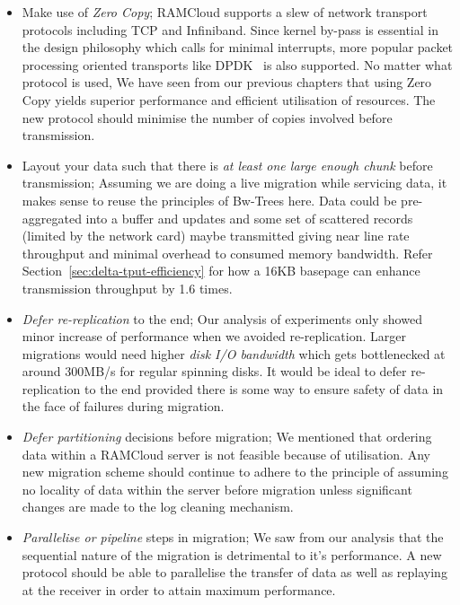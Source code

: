 \begin{itemize}
\item Make use of {\em Zero Copy}; RAMCloud supports a slew of network transport protocols including TCP and Infiniband. Since kernel by-pass is essential in the design philosophy which calls for minimal 
interrupts, more popular packet processing oriented transports like DPDK~\cite{dpdk} is also supported. No matter what protocol is used, We have seen from our previous chapters that 
using Zero Copy yields superior performance and efficient utilisation of resources. The new protocol should minimise the number of copies involved before transmission.

\item Layout your data such that there is {\em at least one large enough chunk} before transmission; Assuming we are doing a live migration while servicing data, it makes sense to reuse the principles of Bw-Trees here. Data 
could be pre-aggregated into a buffer and updates and some set of scattered records (limited by the network card) maybe transmitted giving near line rate throughput and minimal overhead to 
consumed memory bandwidth. Refer Section~\ref{sec:delta-tput-efficiency} for how a 16KB basepage can enhance transmission throughput by 1.6 times.

\item {\em Defer re-replication} to the end; Our analysis of experiments only showed minor increase of performance when we avoided re-replication. Larger migrations would need higher {\em disk I/O bandwidth} which gets bottlenecked at around 
300MB/s for regular spinning disks. It would be ideal to defer re-replication to the end provided there is some way to ensure safety of data in the face of failures during migration.

\item {\em Defer partitioning} decisions before migration; We mentioned that ordering data within a RAMCloud server is not feasible because of utilisation. Any new migration scheme should continue to adhere to the principle of assuming no locality 
of data within the server before migration unless significant changes are made to the log cleaning mechanism.

\item {\em Parallelise or pipeline} steps in migration; We saw from our analysis that the sequential nature of the migration is detrimental to it's performance. A new protocol should be 
able to parallelise the transfer of data as well as replaying at the receiver in order to attain maximum performance. 

\end{itemize}

